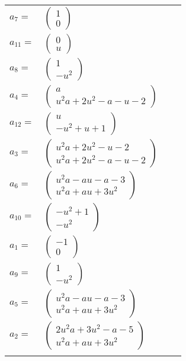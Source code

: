 \documentclass[1p]{elsarticle_modified}
\theoremstyle{definition}
\begin{document}
\begin{tabular}{m{7pt} m{180pt} m{7pt} m{180pt} }
\flushright $a_{7}=$&$\begin{pmatrix}1\\0\end{pmatrix}$ \\
\flushright $a_{11}=$&$\begin{pmatrix}0\\u\end{pmatrix}$ \\
\flushright $a_{8}=$&$\begin{pmatrix}1\\- u^2\end{pmatrix}$ \\
\flushright $a_{4}=$&$\begin{pmatrix}a\\u^2 a+2 u^2- a- u-2\end{pmatrix}$ \\
\flushright $a_{12}=$&$\begin{pmatrix}u\\- u^2+u+1\end{pmatrix}$ \\
\flushright $a_{3}=$&$\begin{pmatrix}u^2 a+2 u^2- u-2\\u^2 a+2 u^2- a- u-2\end{pmatrix}$ \\
\flushright $a_{6}=$&$\begin{pmatrix}u^2 a- a u- a-3\\u^2 a+a u+3 u^2\end{pmatrix}$ \\
\flushright $a_{10}=$&$\begin{pmatrix}- u^2+1\\- u^2\end{pmatrix}$ \\
\flushright $a_{1}=$&$\begin{pmatrix}-1\\0\end{pmatrix}$ \\
\flushright $a_{9}=$&$\begin{pmatrix}1\\- u^2\end{pmatrix}$ \\
\flushright $a_{5}=$&$\begin{pmatrix}u^2 a- a u- a-3\\u^2 a+a u+3 u^2\end{pmatrix}$ \\
\flushright $a_{2}=$&$\begin{pmatrix}2 u^2 a+3 u^2- a-5\\u^2 a+a u+3 u^2\end{pmatrix}$\\&\end{tabular}
\end{document}
